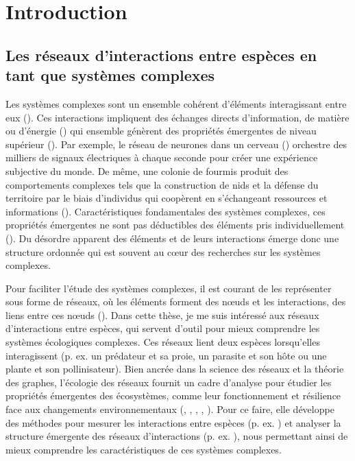 
\francais   
\doublespacing
\chapter*{Introduction}



\section{Les réseaux d'interactions entre espèces en tant que systèmes complexes}

Les systèmes complexes sont un ensemble cohérent d'éléments interagissant entre
eux (\cite{Rind1999Complexity}). Ces interactions impliquent des échanges
directs d'information, de matière ou d'énergie (\cite{Ladyman2013What}) qui
ensemble génèrent des propriétés émergentes de niveau supérieur
(\cite{Foote2007Mathematics}). Par exemple, le réseau de neurones dans un
cerveau (\cite{Sporns2011Human}) orchestre des milliers de signaux électriques à
chaque seconde pour créer une expérience subjective du monde. De même, une
colonie de fourmis produit des comportements complexes tels que la construction
de nids et la défense du territoire par le biais d'individus qui coopèrent en
s'échangeant ressources et informations (\cite{Bonabeau1999Swarm}).
Caractéristiques fondamentales des systèmes complexes, ces propriétés émergentes
ne sont pas déductibles des éléments pris individuellement
(\cite{Nielsen2000Emergent}). Du désordre apparent des éléments et de leurs
interactions émerge donc une structure ordonnée qui est souvent au cœur des
recherches sur les systèmes complexes. 

Pour faciliter l'étude des systèmes complexes, il est courant de les représenter
sous forme de réseaux, où les éléments forment des nœuds et les interactions,
des liens entre ces nœuds (\cite{Newman2003Structure}). Dans cette thèse, je me
suis intéressé aux réseaux d'interactions entre espèces, qui servent d'outil
pour mieux comprendre les systèmes écologiques complexes. Ces réseaux lient deux
espèces lorsqu'elles interagissent (p. ex. un prédateur et sa proie, un parasite
et son hôte ou une plante et son pollinisateur). Bien ancrée dans la science des
réseaux et la théorie des graphes, l'écologie des réseaux fournit un cadre
d'analyse pour étudier les propriétés émergentes des écosystèmes, comme leur
fonctionnement et résilience face aux changements environnementaux
(\cite{Proulx2005Network}, \cite{McCann2007Protecting}, \cite{McCann2011Food},
\cite{Rooney2012Integrating}, \cite{Valiente-Banuet2019Species}). Pour ce faire,
elle développe des méthodes pour mesurer les interactions entre espèces (p. ex.
\cite{Jordano2016Sampling}) et analyser la structure émergente des réseaux
d'interactions (p. ex. \cite{Delmas2019Analysing}), nous permettant ainsi de
mieux comprendre les caractéristiques de ces systèmes complexes. 

